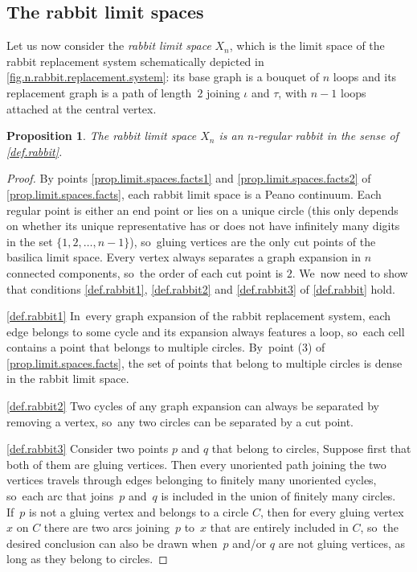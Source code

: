\documentclass[JEP,XML,SOM,Unicode,NoFloatCountersInSection,published]{cedram}
\theoremstyle{plain}
\newtheorem{proposition}[theorem]{Proposition}
\theoremstyle{definition}
\theoremstyle{remark}
\begin{document}
\subsection{The rabbit limit spaces}

Let us now consider the \emph{rabbit limit space} $X_n$, which is the limit space of the rabbit replacement system schematically depicted in \cref{fig.n.rabbit.replacement.system}:
its base graph is a bouquet of $n$ loops and its replacement graph is a path of length~$2$ joining $\iota$ and $\tau$, with $n-1$ loops attached at the central vertex.

\begin{proposition}
The rabbit limit space $X_n$ is an $n$-regular rabbit in the sense of \cref{def.rabbit}.
\end{proposition}

\begin{proof}
By points \cref{prop.limit.spaces.facts1} and \cref{prop.limit.spaces.facts2} of \cref{prop.limit.spaces.facts}, each rabbit limit space is a Peano continuum.
Each regular point is either an end point or lies on a unique circle (this only depends on whether its unique representative has or does not have infinitely many digits in the set $\{1,2,\dots,n-1\}$), so~gluing vertices are the only cut points of the basilica limit space.
Every vertex always separates a graph expansion in $n$ connected components, so~the order of each cut point is $2$. We~now need to show that conditions \cref{def.rabbit1}, \cref{def.rabbit2} and \cref{def.rabbit3} of \cref{def.rabbit} hold.

\cref{def.rabbit1} In~every graph expansion of the rabbit replacement system, each edge belongs to some cycle and its expansion always features a loop, so~each cell contains a point that belongs to multiple circles. By~point (3) of \cref{prop.limit.spaces.facts}, the set of points that belong to multiple circles is dense in the rabbit limit space.

\cref{def.rabbit2}
Two cycles of any graph expansion can always be separated by removing a vertex, so~any two circles can be separated by a cut point.

\cref{def.rabbit3}
Consider two points $p$ and $q$ that belong to circles,
Suppose first that both of them are gluing vertices.
Then every unoriented path joining the two vertices travels through edges belonging to finitely many unoriented cycles, so~each arc that joins~$p$ and~$q$ is included in the union of finitely many circles. If~$p$ is not a gluing vertex and belongs to a circle $C$, then for every gluing vertex $x$ on $C$ there are two arcs joining~$p$ to~$x$ that are entirely included in $C$, so~the desired conclusion can also be drawn when~$p$ and/or $q$ are not gluing vertices, as long as they belong to circles.
\end{proof}
\end{document}
